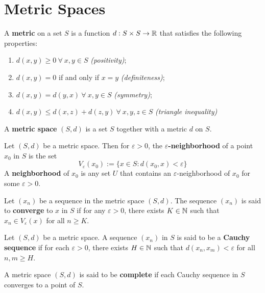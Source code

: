 \section{Metric Spaces}

\begin{definition}
	A \textbf{metric} on a set $S$ is a function $d:S \times S \to \mathbb{R}$ that satisfies the following properties:
	\begin{enumerate}
		\item $d(x,y)\geq 0\ \forall\ x,y\in S$ \textit{(positivity)};
		\item $d(x,y)=0$ if and only if $x=y$ \textit{(definiteness)};
		\item $d(x,y)=d(y,x)\ \forall\ x,y \in S$ \textit{(symmetry)};
		\item $d(x,y)\leq d(x,z)+d(z,y)\ \forall\ x,y,z\in S$ \textit{(triangle inequality)}
	\end{enumerate}
	A \textbf{metric space} $(S,d)$ is a set $S$ together with a metric $d$ on $S$.
\end{definition}

\begin{definition}
	Let $(S,d)$ be a metric space. Then for $\varepsilon>0$, the $\varepsilon$\textbf{-neighborhood} of a point $x_0$ in $S$ is the set
	\[V_\varepsilon(x_0):=\{x \in S :d(x_0,x)<\varepsilon\}\]
	A \textbf{neighborhood} of $x_0$ is any set $U$ that contains an $\varepsilon$-neighborhood of $x_0$ for some $\varepsilon>0$.
\end{definition}

\begin{definition}
	Let $(x_n)$ be a sequence in the metric space $(S,d)$. The sequence $(x_n)$ is said to \textbf{converge} to $x$ in $S$ if for any $\varepsilon>0$, there exists $K \in \mathbb{N}$ such that $x_n \in V_\varepsilon(x)$ for all $n \geq K$.
\end{definition}

\begin{definition}
	Let $(S,d)$ be a metric space. A sequence $(x_n)$ in $S$ is said to be a \textbf{Cauchy sequence} if for each $\varepsilon>0$, there exists $H \in \mathbb{N}$ such that $d(x_n,x_m)<\varepsilon$ for all $n,m \geq H$.
\end{definition}

\begin{definition}
	A metric space $(S,d)$ is said to be \textbf{complete} if each Cauchy sequence in $S$ converges to a point of $S$.
\end{definition}

